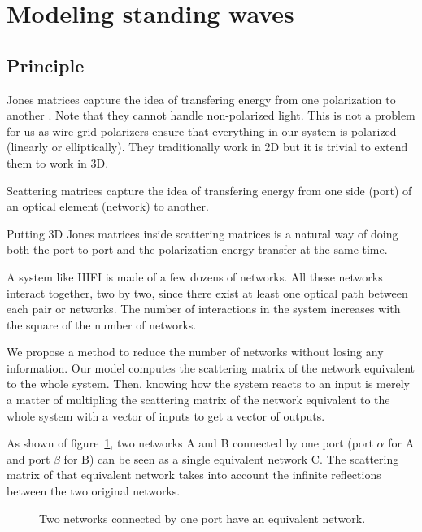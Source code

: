 \documentclass[a4paper,11pt]{article}
\begin{document}

\section{Modeling standing waves}




\subsection{Principle}

Jones matrices capture the idea of transfering energy from one polarization to another \cite{hecht2002optics}.
Note that they cannot handle non-polarized light.
This is not a problem for us as wire grid polarizers ensure that everything in our system is polarized (linearly or elliptically).
They traditionally work in 2D but it is trivial to extend them to work in 3D.

Scattering matrices \cite{siegman1986lasers} capture the idea of transfering energy from one side (port) of an optical element (network) to another.

Putting 3D Jones matrices inside scattering matrices is a natural way of doing both the port-to-port and the polarization energy transfer at the same time.

A system like HIFI is made of a few dozens of networks.
All these networks interact together, two by two, since there exist at least one optical path between each pair or networks.
The number of interactions in the system increases with the square of the number of networks.

We propose a method to reduce the number of networks without losing any information.
Our model computes the scattering matrix of the network equivalent to the whole system.
Then, knowing how the system reacts to an input is merely a matter of multipling the scattering matrix of the network equivalent to the whole system with a vector of inputs to get a vector of outputs.

As shown of figure~\ref{fig:cascading}, two networks A and B connected by one port (port $\alpha$ for A and port $\beta$ for B) can be seen as a single equivalent  network C.
The scattering matrix of that equivalent network takes into account the infinite reflections between the two original networks.
\begin{figure}[hbtp]
    \centering
    
    \caption{\label{fig:cascading}Two networks connected by one port have an equivalent network.}
\end{figure}
\end{document}
